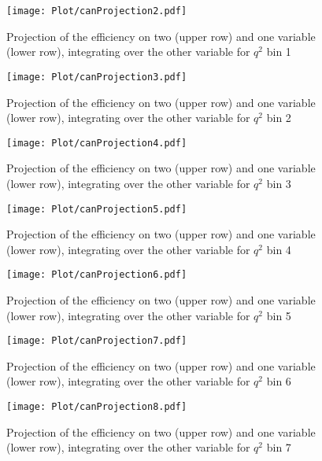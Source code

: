 \begin{figure}[hbt]
    \texttt{[image: Plot/canProjection2.pdf]}
    \caption{Projection of the efficiency on two (upper row) and one variable (lower row), integrating over the other variable for $q^2$ bin 1}
    \label{fig:effPro1}
\end{figure}

\begin{figure}[hbt]
    \texttt{[image: Plot/canProjection3.pdf]}
    \caption{Projection of the efficiency on two (upper row) and one variable (lower row), integrating over the other variable for $q^2$ bin 2}
    \label{fig:effPro2}
\end{figure}

\begin{figure}[hbt]
    \texttt{[image: Plot/canProjection4.pdf]}
    \caption{Projection of the efficiency on two (upper row) and one variable (lower row), integrating over the other variable for $q^2$ bin 3}
    \label{fig:effPro3}
\end{figure}

\begin{figure}[hbt]
    \texttt{[image: Plot/canProjection5.pdf]}
    \caption{Projection of the efficiency on two (upper row) and one variable (lower row), integrating over the other variable for $q^2$ bin 4}
    \label{fig:effPro4}
\end{figure}

\begin{figure}[hbt]
    \texttt{[image: Plot/canProjection6.pdf]}
    \caption{Projection of the efficiency on two (upper row) and one variable (lower row), integrating over the other variable for $q^2$ bin 5}
    \label{fig:effPro5}
\end{figure}

\begin{figure}[hbt]
    \texttt{[image: Plot/canProjection7.pdf]}
    \caption{Projection of the efficiency on two (upper row) and one variable (lower row), integrating over the other variable for $q^2$ bin 6}
    \label{fig:effPro6}
\end{figure}

\begin{figure}[hbt]
    \texttt{[image: Plot/canProjection8.pdf]}
    \caption{Projection of the efficiency on two (upper row) and one variable (lower row), integrating over the other variable for $q^2$ bin 7}
    \label{fig:effPro7}
\end{figure}

